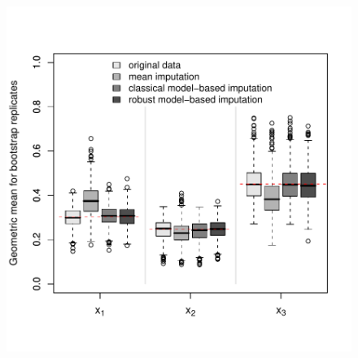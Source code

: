 \documentclass{scrartcl}\usepackage[]{graphicx}\usepackage[]{color}
\begin{document}
\begin{figure}[h]
\begin{center}
%
%
\includegraphics{boxplot}

\end{center}
\end{figure}
\end{document}
